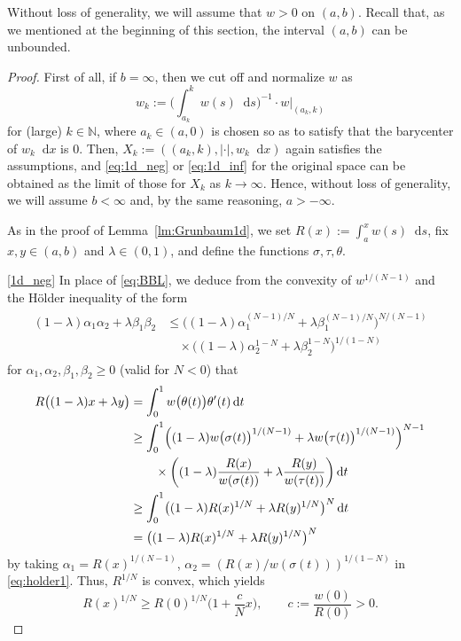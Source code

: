 \documentclass[sts]{imsart}
\theoremstyle{definition}
\theoremstyle{remark}
\newcommand{\N}{\mathbb{N}}
\newcommand*\diff{\mathop{}\!\mathrm{d}}
\begin{document}
Without loss of generality, we will assume that $w>0$ on $(a,b)$.
Recall that, as we mentioned at the beginning of this section, the interval $(a,b)$ can be unbounded.

\begin{proof}
First of all, if $b=\infty$, then we cut off and normalize $w$ as
\[ w_k := \biggl( \int_{a_k}^k w(s) \diff s \biggr)^{-1} \cdot w|_{(a_k,k)} \]
for (large) $k \in \N$, where $a_k \in (a,0)$ is chosen so as to satisfy that the barycenter of $w_k \diff x$ is $0$.
Then, $X_k:=((a_k,k),|\cdot|,w_k \diff x)$ again satisfies the assumptions, and \eqref{eq:1d_neg} or \eqref{eq:1d_inf} for the original space can be obtained as the limit of those for $X_k$ as $k \to \infty$.
Hence, without loss of generality, we will assume $b<\infty$ and, by the same reasoning, $a>-\infty$.

As in the proof of Lemma~\ref{lm:Grunbaum1d}, we set $R(x):=\int_a^x w(s) \diff s$, fix $x,y\in (a,b)$ and $\lambda\in (0,1)$, and define the functions $\sigma, \tau, \theta$.

\eqref{1d_neg}
In place of \eqref{eq:BBL}, we deduce from the convexity of $w^{1/(N-1)}$ and the H\"older inequality of the form
\begin{align}\label{eq:holder1}
\begin{split}
(1-\lambda) \alpha_1 \alpha_2 +\lambda \beta_1 \beta_2
&\le \bigl( (1-\lambda) \alpha_1^{(N-1)/N} +\lambda \beta_1^{(N-1)/N} \bigr)^{N/(N-1)} \\
&\quad \times \bigl( (1-\lambda) \alpha_2^{1-N} +\lambda \beta_2^{1-N} \bigr)^{1/(1-N)}
\end{split}
\end{align}
for $\alpha_1,\alpha_2,\beta_1,\beta_2 \ge 0$ (valid for $N<0$) that
\begin{align*}
R\bigl( (1-\lambda)x +\lambda y \bigr)
&=\int_0^1 w\bigl( \theta(t) \bigr) \theta'(t) \diff t \\
&\ge \int_0^1 \Bigl( (1-\lambda) w\bigl( \sigma(t) \bigr)^{1/(N-1)} +\lambda w\bigl( \tau(t) \bigr)^{1/(N-1)} \Bigr)^{N-1} \\
&\qquad \times \biggl( (1-\lambda) \frac{R(x)}{w(\sigma(t))} +\lambda \frac{R(y)}{w(\tau(t))} \biggr) \diff t \\
&\ge \int_0^1 \bigl( (1-\lambda) R(x)^{1/N} +\lambda R(y)^{1/N} \bigr)^N \diff t \\
&= \bigl( (1-\lambda) R(x)^{1/N} +\lambda R(y)^{1/N} \bigr)^N
\end{align*}
by taking $\alpha_1=R(x)^{1/(N-1)}$, $\alpha_2=(R(x)/w(\sigma(t)))^{1/(1-N)}$ in \eqref{eq:holder1}.
Thus, $R^{1/N}$ is convex, which yields
\begin{equation}\label{eq:H_neg}
R(x)^{1/N} \ge R(0)^{1/N} \biggl( 1+\frac{c}{N}x \biggr), \qquad
c:=\frac{w(0)}{R(0)}>0.
\end{equation}


\end{proof}
\end{document}
